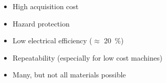 \begin{frame}
    \begin{itemize}
        \item High acquisition cost
        \item Hazard protection
        \item Low electrical efficiency ($\approx$ \SI{20}{\percent})
        \item Repeatability (especially for low cost machines)
        \item Many, but not all materials possible
    \end{itemize}
\end{frame}